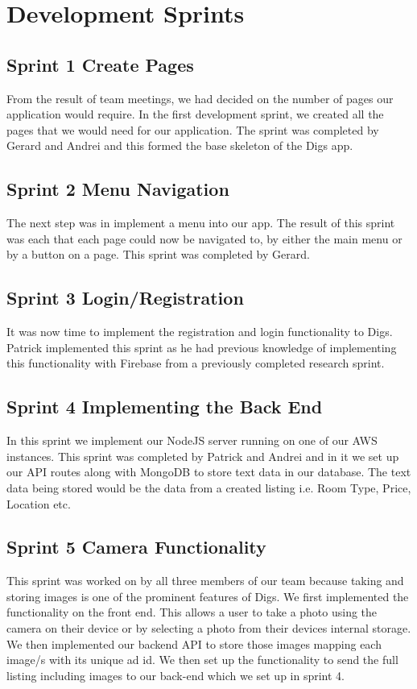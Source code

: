 \section{Development Sprints}\label{development_sprints}
\subsection{Sprint 1 Create Pages}
From the result of team meetings, we had decided on the number of pages our application would require. In the first development sprint, we created all the pages that we would need for our application. The sprint was completed by Gerard and Andrei and this formed the base skeleton of the Digs app.

\subsection{Sprint 2 Menu Navigation}
The next step was in implement a menu into our app. The result of this sprint was each that each page could now be navigated to, by either the main menu or by a button on a page. This sprint was completed by Gerard.

\subsection{Sprint 3 Login/Registration}
It was now time to implement the registration and login functionality to Digs. Patrick implemented this sprint as he had previous knowledge of implementing this functionality with Firebase from a previously completed research sprint.

\subsection{Sprint 4 Implementing the Back End}
In this sprint we implement our NodeJS server running on one of our AWS instances. This sprint was completed by Patrick and Andrei and in it we set up our API routes along with MongoDB to store text data in our database. The text data being stored would be the data from a created listing i.e. Room Type, Price, Location etc.

\subsection{Sprint 5 Camera Functionality}
This sprint was worked on by all three members of our team because taking and storing images is one of the prominent features of Digs. We first implemented the functionality on the front end. This allows a user to take a photo using the camera on their device or by selecting a photo from their devices internal storage. We then implemented our backend API to store those images mapping each image/s with its unique ad id. We then set up the functionality to send the full listing including images to our back-end which we set up in sprint 4.


